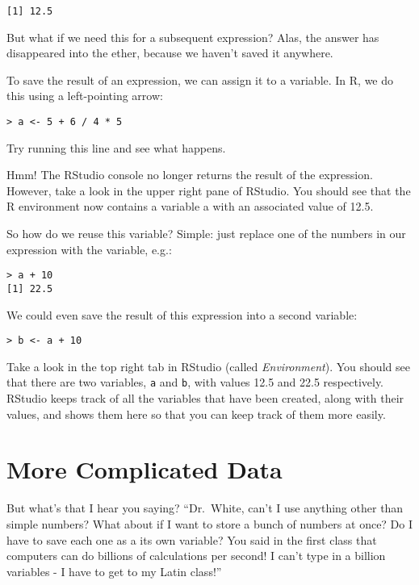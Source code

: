 \documentclass[
]{book}
\begin{document}
\begin{verbatim}
[1] 12.5
\end{verbatim}

But what if we need this for a subsequent expression? Alas, the answer has disappeared into the ether, because we haven't saved it anywhere.

To save the result of an expression, we can assign it to a variable. In R, we do this using a left-pointing arrow:

\begin{verbatim}
> a <- 5 + 6 / 4 * 5
\end{verbatim}

Try running this line and see what happens.

Hmm! The RStudio console no longer returns the result of the expression. However, take a look in the upper right pane of RStudio. You should see that the R environment now contains a variable a with an associated value of 12.5.

So how do we reuse this variable? Simple: just replace one of the numbers in our expression with the variable, e.g.:

\begin{verbatim}
> a + 10
[1] 22.5
\end{verbatim}

We could even save the result of this expression into a second variable:

\begin{verbatim}
> b <- a + 10
\end{verbatim}

Take a look in the top right tab in RStudio (called \emph{Environment}). You should see that there are two variables, \texttt{a} and \texttt{b}, with values 12.5 and 22.5 respectively. RStudio keeps track of all the variables that have been created, along with their values, and shows them here so that you can keep track of them more easily.

\hypertarget{more-complicated-data}{%
\section{More Complicated Data}\label{more-complicated-data}}

But what's that I hear you saying? ``Dr.~White, can't I use anything other than simple numbers? What about if I want to store a bunch of numbers at once? Do I have to save each one as a its own variable? You said in the first class that computers can do billions of calculations per second! I can't type in a billion variables - I have to get to my Latin class!''
\end{document}
